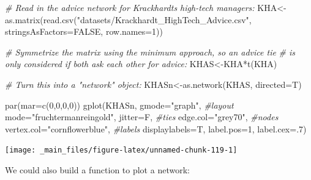 \documentclass[
  notitlepage,
  onecolumn,
  openany]{book}
\newenvironment{Shaded}{\begin{snugshade}}{\end{snugshade}}
\newcommand{\AttributeTok}[1]{\textcolor[rgb]{0.77,0.63,0.00}{#1}}
\newcommand{\CommentTok}[1]{\textcolor[rgb]{0.56,0.35,0.01}{\textit{#1}}}
\newcommand{\ConstantTok}[1]{\textcolor[rgb]{0.00,0.00,0.00}{#1}}
\newcommand{\DecValTok}[1]{\textcolor[rgb]{0.00,0.00,0.81}{#1}}
\newcommand{\FunctionTok}[1]{\textcolor[rgb]{0.00,0.00,0.00}{#1}}
\newcommand{\NormalTok}[1]{#1}
\newcommand{\OtherTok}[1]{\textcolor[rgb]{0.56,0.35,0.01}{#1}}
\newcommand{\SpecialCharTok}[1]{\textcolor[rgb]{0.00,0.00,0.00}{#1}}
\newcommand{\StringTok}[1]{\textcolor[rgb]{0.31,0.60,0.02}{#1}}
\begin{document}
\begin{Shaded}
\begin{Highlighting}[]
\CommentTok{\# Read in the advice network for Krackhardt\textquotesingle{}s high{-}tech managers:}
\NormalTok{KHA}\OtherTok{\textless{}{-}}\FunctionTok{as.matrix}\NormalTok{(}\FunctionTok{read.csv}\NormalTok{(}\StringTok{"datasets/Krackhardt\_HighTech\_Advice.csv"}\NormalTok{,}
                        \AttributeTok{stringsAsFactors=}\ConstantTok{FALSE}\NormalTok{, }\AttributeTok{row.names=}\DecValTok{1}\NormalTok{))}

\CommentTok{\# Symmetrize the matrix using the minimum approach, so an advice tie}
\CommentTok{\# is only considered if both ask each other for advice:}
\NormalTok{KHAS}\OtherTok{\textless{}{-}}\NormalTok{KHA}\SpecialCharTok{*}\FunctionTok{t}\NormalTok{(KHA)}

\CommentTok{\# Turn this into a "network" object:}
\NormalTok{KHASn}\OtherTok{\textless{}{-}}\FunctionTok{as.network}\NormalTok{(KHAS, }\AttributeTok{directed=}\NormalTok{T)}

\FunctionTok{par}\NormalTok{(}\AttributeTok{mar=}\FunctionTok{c}\NormalTok{(}\DecValTok{0}\NormalTok{,}\DecValTok{0}\NormalTok{,}\DecValTok{0}\NormalTok{,}\DecValTok{0}\NormalTok{))}
\FunctionTok{gplot}\NormalTok{(KHASn, }
      \AttributeTok{gmode=}\StringTok{"graph"}\NormalTok{,}
      \CommentTok{\#layout}
      \AttributeTok{mode=}\StringTok{"fruchtermanreingold"}\NormalTok{,}
      \AttributeTok{jitter=}\NormalTok{F,}
      \CommentTok{\#ties}
      \AttributeTok{edge.col=}\StringTok{"grey70"}\NormalTok{,}
      \CommentTok{\#nodes}
      \AttributeTok{vertex.col=}\StringTok{"cornflowerblue"}\NormalTok{,}
      \CommentTok{\#labels}
      \AttributeTok{displaylabels=}\NormalTok{T,}
      \AttributeTok{label.pos=}\DecValTok{1}\NormalTok{,}
      \AttributeTok{label.cex=}\NormalTok{.}\DecValTok{7}\NormalTok{)}
\end{Highlighting}
\end{Shaded}

\begin{center}\texttt{[image: \_main\_files/figure-latex/unnamed-chunk-119-1]} \end{center}

We could also build a function to plot a network:
\end{document}
